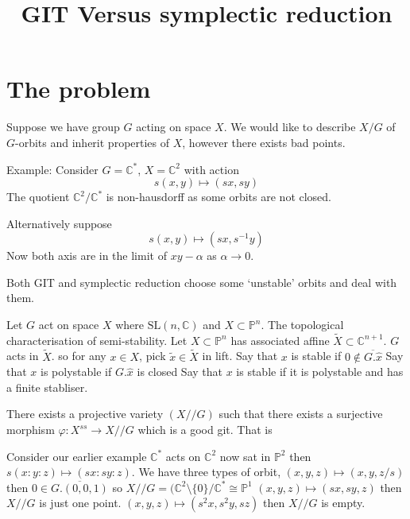 % 

\title{GIT Versus symplectic reduction}
\author{}
\date{}

 
\maketitle
\section{The problem } %

Suppose we have group $G$ acting on space $X$. 
We would like to describe $ X/G $ of $ G$-orbits and inherit properties of $X$, 
however there exists bad points. 

Example: 
Consider $ G = \mathbb{C} ^* $, $ X = \mathbb{C} ^2 $ with action 
\begin{equation}
    s(x,y) \mapsto (sx, sy) 
\end{equation}
The quotient $ \mathbb{C} ^2 / \mathbb{C} ^* $ is non-hausdorff as some orbits are not closed. 

Alternatively suppose
\begin{equation}
    s(x,y) \mapsto (sx, s^{-1} y) 
\end{equation}
Now both axis are in the limit of $xy- \alpha $ as $\alpha \rightarrow 0 $.

Both GIT and symplectic reduction choose some `unstable' orbits and deal with them. 


Let $ G$ act on space $X$ where $ \mathrm{SL} ( n , \mathbb{C} ) $ and $ X \subset \mathbb{P} ^n $.
The topological characterisation of semi-stability. 
Let $X \subset \mathbb{P} ^n $ has associated affine $ \tilde{X} \subset \mathbb{C} ^{n+1} $. 
$G$ acts in $ \tilde{X} $. 
so for any $ x \in X $, pick $ \tilde{x} \in \tilde{X} $ in lift.
Say that $x$ is stable if $0 \notin \overline{G . \hat{x} } $
Say that $x$ is polystable if $G . \hat{x}  $ is closed 
Say that $x$ is stable if it is polystable and has a finite stabliser.

\begin{theorem}
    There exists a projective variety $( X//G ) $ such that there exists a surjective morphism 
    $\varphi : X^{ss} \rightarrow X//G $ which is a good git. 
    That is 
\end{theorem}

Consider our earlier example $ \mathbb{C}  ^* $ acts on $ \mathbb{C} ^2 $ now sat in $ \mathbb{P} ^2$
then 
$s(x:y:z) \mapsto ( sx: sy: z) $. 
We have three types of orbit, 
$(x,y,z) \mapsto (x,y,z/s) $ then $ 0 \in \overline{G . ( 0,0,1) } $ so $ X// G = (\mathbb{C} ^2 \setminus \{0\} / \mathbb{C} ^* \cong \mathbb{P} ^1 $
$(x,y,z) \mapsto (sx,sy,z) $ then $ X// G $ is just one point.
$(x,y,z) \mapsto (s^2x,s^2 y, sz) $ then $ X// G $ is empty.

